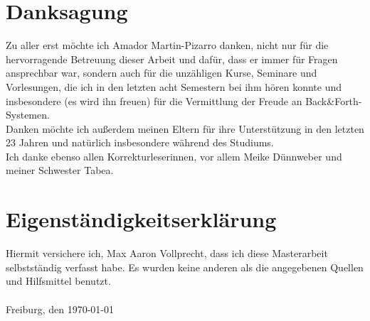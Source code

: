 \chapter*{Danksagung}
Zu aller erst möchte ich Amador Martin-Pizarro danken, nicht nur für die hervorragende Betreuung dieser Arbeit und dafür, dass er immer für Fragen ansprechbar war, sondern auch für die unzähligen Kurse, Seminare und Vorlesungen, die ich in den letzten acht Semestern bei ihm hören konnte und insbesondere (es wird ihn freuen) für die Vermittlung der Freude an Back\&Forth-Systemen.\\
Danken möchte ich außerdem meinen Eltern für ihre Unterstützung in den letzten 23 Jahren und natürlich insbesondere während des Studiums.\\
Ich danke ebenso allen Korrekturleserinnen, vor allem Meike Dünnweber und meiner Schwester Tabea.
\chapter*{Eigenständigkeitserklärung}
\vspace{0.8cm}
Hiermit versichere ich, Max Aaron Vollprecht, dass ich diese Masterarbeit selbstständig verfasst habe. Es wurden keine anderen als die angegebenen Quellen und Hilfsmittel benutzt.
\\ \\
Freiburg, den \today

\newpage
\thispagestyle{empty}
\mbox{}
\newpage

